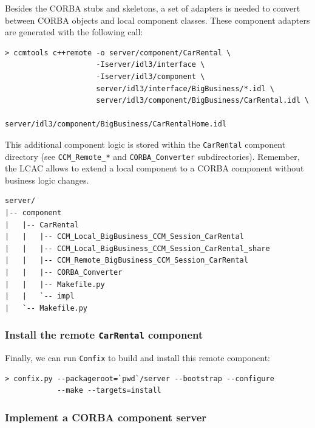 Besides the CORBA stubs and skeletons, a set of adapters is needed to
convert between CORBA objects and local component classes.
These component adapters are generated with the following call:
\begin{small}
\begin{verbatim}
> ccmtools c++remote -o server/component/CarRental \
                     -Iserver/idl3/interface \
                     -Iserver/idl3/component \
                     server/idl3/interface/BigBusiness/*.idl \
                     server/idl3/component/BigBusiness/CarRental.idl \
                     server/idl3/component/BigBusiness/CarRentalHome.idl
\end{verbatim}
\end{small}

This additional component logic is stored within the {\tt CarRental}
component directory (see {\tt CCM\_Remote\_*} and {\tt CORBA\_Converter}
subdirectories).
Remember, the LCAC allows to extend a local component to a CORBA component
without business logic changes. 
\begin{small}
\begin{verbatim}
server/
|-- component
|   |-- CarRental
|   |   |-- CCM_Local_BigBusiness_CCM_Session_CarRental
|   |   |-- CCM_Local_BigBusiness_CCM_Session_CarRental_share
|   |   |-- CCM_Remote_BigBusiness_CCM_Session_CarRental
|   |   |-- CORBA_Converter
|   |   |-- Makefile.py
|   |   `-- impl
|   `-- Makefile.py
\end{verbatim}
\end{small}


\subsubsection{Install the remote {\tt CarRental} component}
Finally, we can run {\tt Confix} to build and install this remote component:
\begin{small}
\begin{verbatim}
> confix.py --packageroot=`pwd`/server --bootstrap --configure 
            --make --targets=install
\end{verbatim}
\end{small}



\subsubsection{Implement a CORBA component server}

